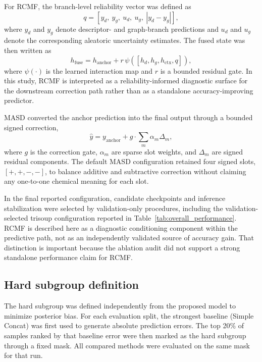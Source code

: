 \documentclass[review,12pt]{elsarticle}
\begin{document}
For RCMF, the branch-level reliability vector was defined as
\begin{equation}
q = [y_d,\ y_g,\ u_d,\ u_g,\ |y_d-y_g|],
\end{equation}
where $y_d$ and $y_g$ denote descriptor- and graph-branch predictions and $u_d$ and $u_g$ denote the corresponding aleatoric uncertainty estimates. The fused state was then written as
\begin{equation}
h_{\text{fuse}} = h_{\text{anchor}} + r\,\psi([h_d,h_g,h_{\text{ctx}},q]),
\end{equation}
where $\psi(\cdot)$ is the learned interaction map and $r$ is a bounded residual gate. In this study, RCMF is interpreted as a reliability-informed diagnostic surface for the downstream correction path rather than as a standalone accuracy-improving predictor.

MASD converted the anchor prediction into the final output through a bounded signed correction,
\begin{equation}
\hat{y}=y_{\text{anchor}} + g\cdot \sum_m \alpha_m \Delta_m,
\end{equation}
where $g$ is the correction gate, $\alpha_m$ are sparse slot weights, and $\Delta_m$ are signed residual components. The default MASD configuration retained four signed slots, $[+,+,-,-]$, to balance additive and subtractive correction without claiming any one-to-one chemical meaning for each slot.

In the final reported configuration, candidate checkpoints and inference stabilization were selected by validation-only procedures, including the validation-selected trisoup configuration reported in Table~\ref{tab:overall_performance}. RCMF is described here as a diagnostic conditioning component within the predictive path, not as an independently validated source of accuracy gain. That distinction is important because the ablation audit did not support a strong standalone performance claim for RCMF.

\subsection{Hard subgroup definition}

The hard subgroup was defined independently from the proposed model to minimize posterior bias. For each evaluation split, the strongest baseline (Simple Concat) was first used to generate absolute prediction errors. The top 20\% of samples ranked by that baseline error were then marked as the hard subgroup through a fixed mask. All compared methods were evaluated on the same mask for that run.
\end{document}
